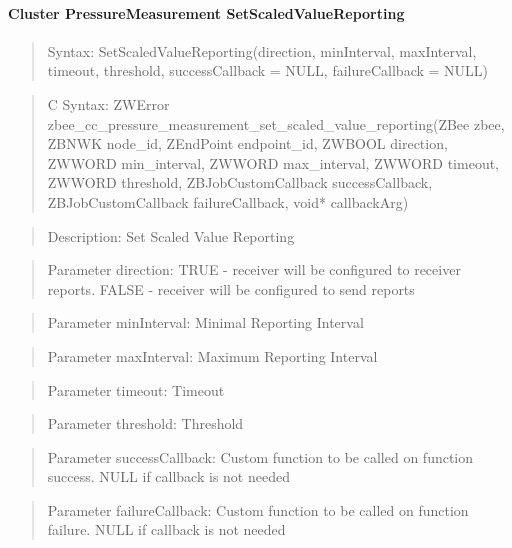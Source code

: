 \paragraph{Cluster PressureMeasurement SetScaledValueReporting}
\begin{quote}Syntax: SetScaledValueReporting(direction, minInterval, maxInterval, timeout, threshold, successCallback = NULL, failureCallback = NULL)\end{quote}
\begin{quote}C Syntax: ZWError zbee\_cc\_pressure\_measurement\_set\_scaled\_value\_reporting(ZBee zbee, ZBNWK node\_id, ZEndPoint endpoint\_id, ZWBOOL direction, ZWWORD min\_interval, ZWWORD max\_interval, ZWWORD timeout, ZWWORD threshold, ZBJobCustomCallback successCallback, ZBJobCustomCallback failureCallback, void* callbackArg)\end{quote}
\begin{quote}Description: Set Scaled Value Reporting\end{quote}
\begin{quote}Parameter direction: TRUE  - receiver will be configured to receiver reports. FALSE - receiver will be configured to send reports\end{quote}
\begin{quote}Parameter minInterval: Minimal Reporting Interval\end{quote}
\begin{quote}Parameter maxInterval: Maximum Reporting Interval\end{quote}
\begin{quote}Parameter timeout: Timeout\end{quote}
\begin{quote}Parameter threshold: Threshold\end{quote}
\begin{quote}Parameter successCallback: Custom function to be called on function success. NULL if callback is not needed\end{quote}
\begin{quote}Parameter failureCallback: Custom function to be called on function failure. NULL if callback is not needed\end{quote}


